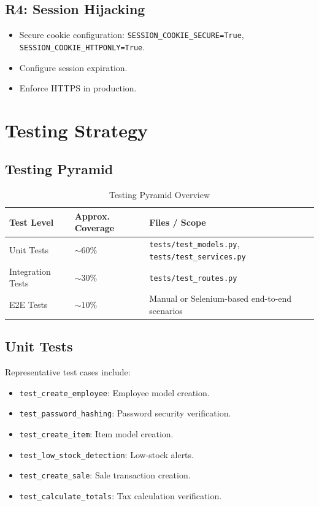 \subsection{R4: Session Hijacking}

\begin{itemize}[leftmargin=1.2cm]
  \item Secure cookie configuration: \texttt{SESSION\_COOKIE\_SECURE=True},
        \texttt{SESSION\_COOKIE\_HTTPONLY=True}.
  \item Configure session expiration.
  \item Enforce HTTPS in production.
\end{itemize}

\section{Testing Strategy}

\subsection{Testing Pyramid}

\begin{table}[h]
  \centering
  \caption{Testing Pyramid Overview}
  \begin{tabular}{p{3cm} p{3cm} p{7cm}}
    \toprule
    \textbf{Test Level} & \textbf{Approx. Coverage} & \textbf{Files / Scope} \\
    \midrule
    Unit Tests & $\sim 60\%$ & \texttt{tests/test\_models.py}, \texttt{tests/test\_services.py} \\
    Integration Tests & $\sim 30\%$ & \texttt{tests/test\_routes.py} \\
    E2E Tests & $\sim 10\%$ & Manual or Selenium-based end-to-end scenarios \\
    \bottomrule
  \end{tabular}
\end{table}

\subsection{Unit Tests}

Representative test cases include:
\begin{itemize}[leftmargin=1.2cm]
  \item \texttt{test\_create\_employee}: Employee model creation.
  \item \texttt{test\_password\_hashing}: Password security verification.
  \item \texttt{test\_create\_item}: Item model creation.
  \item \texttt{test\_low\_stock\_detection}: Low-stock alerts.
  \item \texttt{test\_create\_sale}: Sale transaction creation.
  \item \texttt{test\_calculate\_totals}: Tax calculation verification.
\end{itemize}

